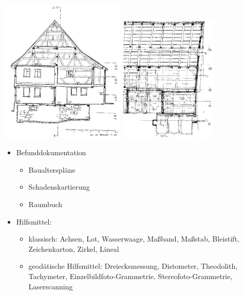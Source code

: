 \documentclass[fleqn,twoside,dvipsnames]{article}
\begin{document}
                \includegraphics[width=0.45\textwidth]{Grafiken/Denkmalschutz und Denkmalpflege/Genauigkeitsstufe 3.png}
                \includegraphics[width=0.35\textwidth]{Grafiken/Denkmalschutz und Denkmalpflege/Genauigkeitsstufe 4.png}\\
        \begin{itemize}
            \item Befunddokumentation
                \begin{itemize}
                    \item Baualterspläne
                    \item Schadenskartierung
                    \item Raumbuch
                \end{itemize}
            \item Hilfsmittel:
                \begin{itemize}
                    \item klassisch: Achsen, Lot, Wasserwaage, Maßband, Maßstab, Bleistift, Zeichenkarton, Zirkel, Lineal
                    \item geodätische Hilfsmittel: Dreiecksmessung, Distometer, Theodolith, Tachymeter, Einzelbildfoto-Grammetrie, Stereofoto-Grammetrie, Laserscanning
                \end{itemize}
        \end{itemize}
\end{document}
